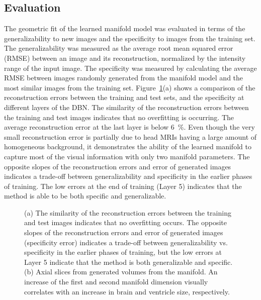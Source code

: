 \subsection{Evaluation}

The geometric fit of the learned manifold model was evaluated in terms of the
generalizability to new images and the specificity to images from the training
set. The generalizability was measured as the average root mean squared error
(RMSE) between an image and its reconstruction, normalized by the intensity
range of the input image. The specificity was measured by calculating the
average RMSE between images randomly generated from the manifold model and the
most similar images from the training set. Figure~\ref{fig:genspe}(a) shows a
comparison of the reconstruction errors between the training and test sets, and
the specificity at different layers of the DBN. The similarity of the
reconstruction errors between the training and test images indicates that no
overfitting is occurring. The average reconstruction error at the last layer is
below \SI{6}{\percent}. Even though the very small reconstruction error is
partially due to head MRIs having a large amount of homogeneous background, it
demonstrates the ability of the learned manifold to capture most of the visual
information with only two manifold parameters. The opposite slopes of the
reconstruction errors and error of generated images indicates a trade-off
between generalizability and specificity in the earlier phases of training. The
low errors at the end of training (Layer 5) indicates that the method is able to
be both specific and generalizable.

\begin{figure}[tb]
\centering
{}\qquad \quad\quad 
{} 

\caption{(a) The similarity of the reconstruction errors between the training
and test images indicates that no overfitting occurs. The opposite slopes of the
reconstruction errors and error of generated images (specificity error)
indicates a trade-off between generalizability vs. specificity in the earlier
phases of training, but the low errors at Layer 5 indicate that the method is
both generalizable and specific.
(b) Axial slices from generated volumes from the manifold. An increase of the
first and second manifold dimension visually correlates with an increase in
brain and ventricle size, respectively.}
\label{fig:genspe}
\end{figure}

